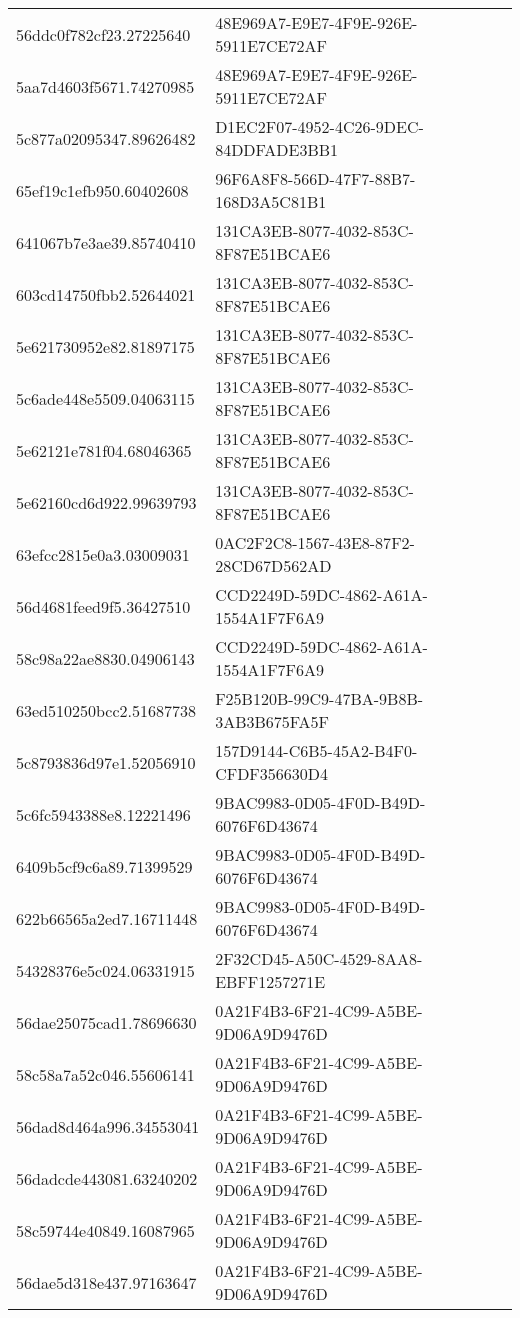 \begin{tabular}{ll}
56ddc0f782cf23.27225640 & 48E969A7-E9E7-4F9E-926E-5911E7CE72AF \\
5aa7d4603f5671.74270985 & 48E969A7-E9E7-4F9E-926E-5911E7CE72AF \\
5c877a02095347.89626482 & D1EC2F07-4952-4C26-9DEC-84DDFADE3BB1 \\
65ef19c1efb950.60402608 & 96F6A8F8-566D-47F7-88B7-168D3A5C81B1 \\
641067b7e3ae39.85740410 & 131CA3EB-8077-4032-853C-8F87E51BCAE6 \\
603cd14750fbb2.52644021 & 131CA3EB-8077-4032-853C-8F87E51BCAE6 \\
5e621730952e82.81897175 & 131CA3EB-8077-4032-853C-8F87E51BCAE6 \\
5c6ade448e5509.04063115 & 131CA3EB-8077-4032-853C-8F87E51BCAE6 \\
5e62121e781f04.68046365 & 131CA3EB-8077-4032-853C-8F87E51BCAE6 \\
5e62160cd6d922.99639793 & 131CA3EB-8077-4032-853C-8F87E51BCAE6 \\
63efcc2815e0a3.03009031 & 0AC2F2C8-1567-43E8-87F2-28CD67D562AD \\
56d4681feed9f5.36427510 & CCD2249D-59DC-4862-A61A-1554A1F7F6A9 \\
58c98a22ae8830.04906143 & CCD2249D-59DC-4862-A61A-1554A1F7F6A9 \\
63ed510250bcc2.51687738 & F25B120B-99C9-47BA-9B8B-3AB3B675FA5F \\
5c8793836d97e1.52056910 & 157D9144-C6B5-45A2-B4F0-CFDF356630D4 \\
5c6fc5943388e8.12221496 & 9BAC9983-0D05-4F0D-B49D-6076F6D43674 \\
6409b5cf9c6a89.71399529 & 9BAC9983-0D05-4F0D-B49D-6076F6D43674 \\
622b66565a2ed7.16711448 & 9BAC9983-0D05-4F0D-B49D-6076F6D43674 \\
54328376e5c024.06331915 & 2F32CD45-A50C-4529-8AA8-EBFF1257271E \\
56dae25075cad1.78696630 & 0A21F4B3-6F21-4C99-A5BE-9D06A9D9476D \\
58c58a7a52c046.55606141 & 0A21F4B3-6F21-4C99-A5BE-9D06A9D9476D \\
56dad8d464a996.34553041 & 0A21F4B3-6F21-4C99-A5BE-9D06A9D9476D \\
56dadcde443081.63240202 & 0A21F4B3-6F21-4C99-A5BE-9D06A9D9476D \\
58c59744e40849.16087965 & 0A21F4B3-6F21-4C99-A5BE-9D06A9D9476D \\
56dae5d318e437.97163647 & 0A21F4B3-6F21-4C99-A5BE-9D06A9D9476D \\

\end{tabular}
